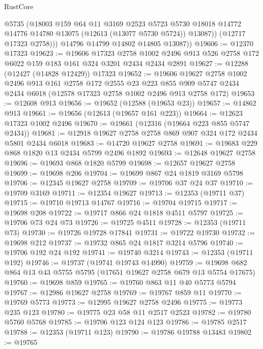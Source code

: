 \begin{lexlean}{RustCore}
\begin{coremodule}
              @5735
              (@18003
                @159
                @64
                @11
                @3169
                @2523
                @5723
                @5730
                @18018
                @14772
                @14776
                @14780
                @13075
                (@12613 (@13077 @5730 @5724))
                @13087))
            (@12717 @17323 @2758)))
        @14796
        @14799
        @14802
        @14805
        @13087))
@19606 := @12370 @17323
@19623 := @19606
    @17323
    @2758
    @1002
    @2496
    @913
    @526
    @2758
    @172
    @6022
    @159
    @183
    @161
    @324
    @3201
    @2434
    @2434
    @2891
@19627 := @12288 (@12427 (@14828 @12429)) @17323
@19652 := @19606
    @19627
    @2758
    @1002
    @2496
    @913
    @161
    @2758
    @172
    @2555
    @23
    @223
    @855
    @909
    @5747
    @2434
    @2434
    @6018
    (@12578 @17323 @2758 @1002 @2496 @913 @2758 @172)
@19653 := @12608 @913
@19656 := @19652 (@12588 (@19653 @23))
@19657 := @14862 @913
@19661 := @19656 (@12613 (@19657 @161 @223))
@19664 := @12623 @17323 @1002 @2496
@19670 := @19661 (@12316 (@19664 @223 @855 @5747 @2434))
@19681 := @12918 @19627 @2758 @2758 @869 @907 @324 @172 @2434 @5801 @2434 @6018
@19683 := @14720 @19627 @2758
@19691 := @19683 @229 @868 @1820 @13 @2434 @5799 @2496 @1892
@19693 := @12648 @19627 @2758
@19696 := @19693 @868 @1820 @5799
@19698 := @12657 @19627 @2758
@19699 := @19698 @206
@19704 := @19699 @867 @24 @1819 @3169 @5798
@19706 := @12345 @19627 @2758
@19709 := @19706 @37 @24 @37
@19710 := @19709 @3169
@19711 := @12354 @19627
@19713 := @12353 (@19711 @37)
@19715 := @19710 @19713 @14767
@19716 := @19704 @19715
@19717 := @19698 @208
@19722 := @19717 @866 @24 @1818 @4511 @5797
@19725 := @19706 @73 @24 @73
@19726 := @19725 @4511
@19728 := @12353 (@19711 @73)
@19730 := @19726 @19728 @17841
@19731 := @19722 @19730
@19732 := @19698 @212
@19737 := @19732 @865 @24 @1817 @3214 @5796
@19740 := @19706 @192 @24 @192
@19741 := @19740 @3214
@19743 := @12353 (@19711 @192)
@19746 := @19737 (@19741 @19743 @14990)
@19759 := @19698 @682 @864 @13 @43 @5755 @5795 (@17651 @19627 @2758 @679 @13 @5754 @17675)
@19760 := @19698 @859
@19765 := @19760 @863 @11 @40 @5773 @5794
@19767 := @12986 @19627 @2758
@19769 := @19767 @859 @11
@19770 := @19769 @5773
@19773 := @12995 @19627 @2758 @2496
@19775 := @19773 @235 @123
@19780 := @19775 @23 @58 @11 @2517 @2523
@19782 := @19780 @5760 @5768
@19785 := @19706 @123 @124 @123
@19786 := @19785 @2517
@19788 := @12353 (@19711 @123)
@19790 := @19786 @19788 @13483
@19802 := @19765

\end{coremodule}
\end{lexlean}
